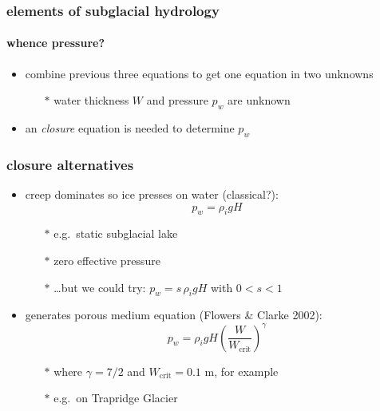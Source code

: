 \documentclass[hide notes,intlimits]{beamer}
\begin{document}
\begin{frame}
  \frametitle{elements of subglacial hydrology}
  \framesubtitle{whence pressure?}

  \begin{itemize}
    \item combine previous three equations to get one equation in two unknowns
      \begin{itemize}
      \item[$\ast$] water thickness $W$ and pressure $p_w$ are unknown
      \end{itemize}
      
    \item an \emph{closure} equation is needed to determine $p_w$
  \end{itemize}

\end{frame}


\begin{frame}
  \frametitle{closure alternatives}

  \begin{itemize}
    \item creep dominates so ice presses on water (classical?):
        $$p_w = \rho_i g H$$
      \begin{itemize}
      \vspace{-4mm}
      \item[$\ast$]  e.g.~static subglacial lake
      \item[$\ast$]  zero effective pressure
      \item[$\ast$]  \dots but we could try:  $p_w = s\, \rho_i g H$ with $0<s<1$
      \end{itemize}

\bigskip
    \item generates porous medium equation (Flowers \& Clarke 2002):
        $$p_w = \rho_i g H \left(\frac{W}{W_{\text{crit}}}\right)^\gamma$$
      \begin{itemize}
      \vspace{-1mm}
      \item[$\ast$]  where $\gamma=7/2$ and $W_{\text{crit}}=0.1$ m, for example
      \item[$\ast$]  e.g.~on Trapridge Glacier
      \end{itemize}
  \end{itemize}

\end{frame}
\end{document}
